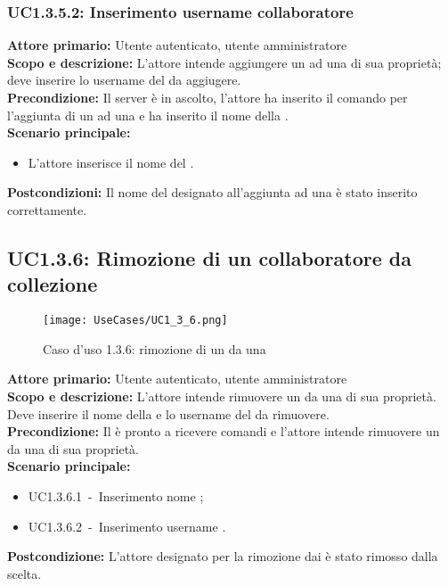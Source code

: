 \documentclass{scalatekids-article}
\begin{document}
\subsubsection{UC1.3.5.2: Inserimento username collaboratore}

\textbf{Attore primario:} Utente autenticato, utente amministratore\\
\textbf{Scopo e descrizione:} L'attore intende aggiungere un  ad una  di sua proprietà; deve inserire lo username del  da aggiugere.\\
\textbf{Precondizione:} Il server è in ascolto, l'attore ha inserito il comando per l'aggiunta di un  ad una  e ha inserito il nome della .\\
\textbf{Scenario principale:}
\begin{itemize}
\item L'attore inserisce il nome del .
\end{itemize}
\textbf{Postcondizioni:} Il nome del  designato all'aggiunta ad una  è stato inserito correttamente.

\subsection{UC1.3.6: Rimozione di un collaboratore da collezione}

\begin{figure}[H]
  \begin{center}
    \texttt{[image: UseCases/UC1\_3\_6.png]}
    \caption*{Caso d'uso 1.3.6: rimozione di un  da una }
  \end{center}
\end{figure}
\textbf{Attore primario:} Utente autenticato, utente amministratore\\
\textbf{Scopo e descrizione:} L'attore intende rimuovere un  da una  di sua proprietà. Deve inserire il nome della  e lo username del  da rimuovere.\\
\textbf{Precondizione:} Il  è pronto a ricevere comandi e l'attore intende rimuovere un  da una  di sua proprietà.\\
\textbf{Scenario principale:}
\begin{itemize}
\item UC1.3.6.1\ -\ Inserimento nome ;
\item UC1.3.6.2\ -\ Inserimento username .
\end{itemize}
\textbf{Postcondizione:} L'attore designato per la rimozione dai  è stato rimosso dalla  scelta.
\end{document}
